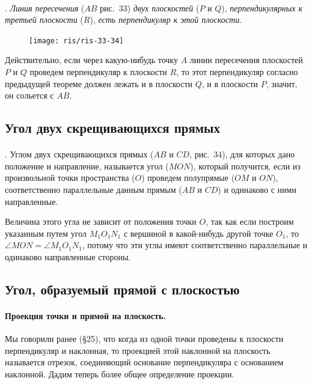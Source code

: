 \documentclass[twoside]{book}
\begin{document}
\paragraph{}\label{1938/s45}
.
\emph{Линия пересечения} ($AB$ рис.~33) \emph{двух плоскостей} ($P$ и $Q$), \emph{перпендикулярных к третьей плоскости} ($R$), \emph{есть перпендикуляр к этой плоскости}.

\begin{figure}[h!]
\centering
\texttt{[image: ris/ris-33-34]}
\caption{}
\end{figure}

Действительно, если через какую-нибудь точку $A$ линии пересечения плоскостей $P$ и $Q$ проведем перпендикуляр к плоскости $R$, то этот перпендикуляр согласно предыдущей теореме должен лежать и в плоскости $Q$, и в плоскости $P$, значит, он сольется с $AB$.

\subsection*{Угол двух скрещивающихся прямых}

\paragraph{}\label{1938/s46}
.
Углом двух скрещивающихся прямых ($AB$ и $CD$, рис.~34), для которых дано положение и направление, называется угол ($MON$), который получится, если из произвольной точки пространства ($O$) проведем полупрямые ($OM$ и $ON$), соответственно параллельные данным прямым ($AB$ и $CD$) и одинаково с ними направленные.

Величина этого угла не зависит от положения точки $O$, так как если построим указанным путем угол $M_1O_1N_1$ с вершиной в какой-нибудь другой точке $O_1$, то $\angle MON = \angle M_1O_1N_1$, потому что эти углы имеют соответственно параллельные и одинаково направленные стороны.

\subsection*{Угол, образуемый прямой с плоскостью}

\paragraph{Проекция точки и прямой на плоскость.}\label{1938/s47}
Мы говорили ранее (§25), что когда из одной точки проведены к плоскости перпендикуляр и наклонная, то проекцией этой наклонной на плоскость называется отрезок, соединяющий основание перпендикуляра с основанием наклонной.
Дадим теперь более общее определение проекции.
\end{document}
